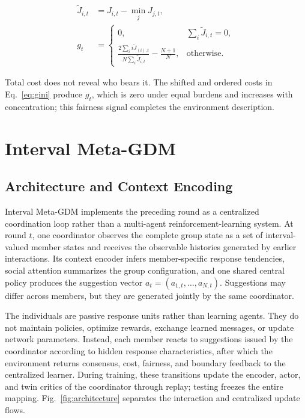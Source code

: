 \documentclass[journal]{IEEEtran}
\newcommand{\eqnote}[1]{\par\vspace{-0.3ex}\noindent #1\par\vspace{0.4ex}}
\begin{document}
\begin{equation}
\begin{aligned}
\widetilde J_{i,t}&=J_{i,t}-\min_j J_{j,t},\\
g_t&=
\begin{cases}
0, & \sum_i\widetilde J_{i,t}=0,\\[2pt]
\displaystyle
\frac{2\sum_i i\widetilde J_{(i),t}}
{N\sum_i\widetilde J_{i,t}}-\frac{N+1}{N}, & \text{otherwise}.
\end{cases}
\end{aligned}
\label{eq:gini}
\end{equation}

\eqnote{Total cost does not reveal who bears it. The shifted and ordered costs in Eq.~\eqref{eq:gini} produce $g_t$, which is zero under equal burdens and increases with concentration; this fairness signal completes the environment description.}

\section{Interval Meta-GDM}
\label{sec:model}

\subsection{Architecture and Context Encoding}

Interval Meta-GDM implements the preceding round as a centralized coordination loop rather than a multi-agent reinforcement-learning system. At round $t$, one coordinator observes the complete group state as a set of interval-valued member states and receives the observable histories generated by earlier interactions. Its context encoder infers member-specific response tendencies, social attention summarizes the group configuration, and one shared central policy produces the suggestion vector $a_t=(a_{1,t},\ldots,a_{N,t})$. Suggestions may differ across members, but they are generated jointly by the same coordinator.

The individuals are passive response units rather than learning agents. They do not maintain policies, optimize rewards, exchange learned messages, or update network parameters. Instead, each member reacts to suggestions issued by the coordinator according to hidden response characteristics, after which the environment returns consensus, cost, fairness, and boundary feedback to the centralized learner. During training, these transitions update the encoder, actor, and twin critics of the coordinator through replay; testing freezes the entire mapping. Fig.~\ref{fig:architecture} separates the interaction and centralized update flows.
\end{document}
